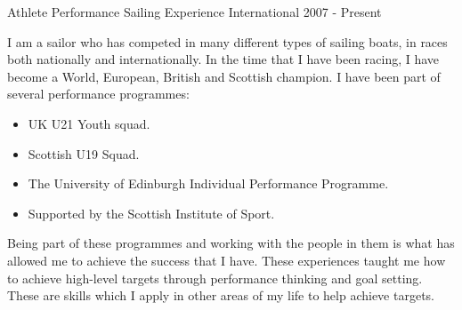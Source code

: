 



    
  \cventry
    {Athlete} %
    {Performance Sailing Experience} %
    {International} %
    {2007 - Present} %
    {
      I am a sailor who has competed in many different types of sailing boats, in races both nationally and internationally. In the time that I have been racing, I have become a World, European, British and Scottish champion. I have been part of several performance programmes:
      \begin{itemize}
          \item UK U21 Youth squad.
          \item Scottish U19 Squad.
          \item The University of Edinburgh Individual Performance Programme.
          \item Supported by the Scottish Institute of Sport.
      \end{itemize}
      Being part of these programmes and working with the people in them is what has allowed me to achieve the success that I have. These experiences taught me how to achieve high-level targets through performance thinking and goal setting. These are skills which I apply in other areas of my life to help achieve targets. 
    }


